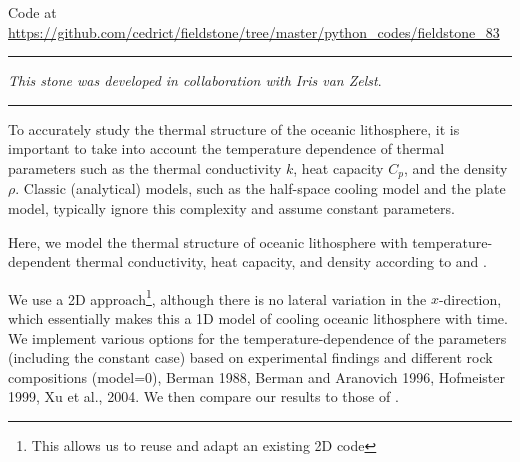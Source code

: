 

\begin{center}
Code at \url{https://github.com/cedrict/fieldstone/tree/master/python_codes/fieldstone_83}
\end{center}

\par\noindent\rule{\textwidth}{0.4pt}

{\sl This stone was developed in collaboration with Iris van Zelst}. 

\par\noindent\rule{\textwidth}{0.4pt}


To accurately study the thermal structure of the oceanic lithosphere, it is important to take 
into account the temperature dependence of thermal parameters such as the thermal conductivity $k$, 
heat capacity $C_p$, and the density $\rho$. Classic (analytical) models, such as the half-space 
cooling model and the plate model, typically ignore this complexity and assume constant parameters.
 
Here, we model the thermal structure of oceanic lithosphere with temperature-dependent 
thermal conductivity, heat capacity, and density according to \textcite{mcjp05} 
and \textcite{rihc18}. 

We use a 2D approach\footnote{This allows us to reuse and adapt an existing 2D code}, 
although there is no lateral variation in the $x$-direction, 
which essentially makes this a 1D model of cooling oceanic lithosphere with time. 
We implement various options for the temperature-dependence of the parameters (including the constant case) 
based on experimental findings and different rock compositions \textcite{pasc77} ({\python model=0}), 
Berman 1988, Berman and Aranovich 1996, Hofmeister 1999, Xu et al., 2004. 
We then compare our results to those of \textcite{rihc18}.

